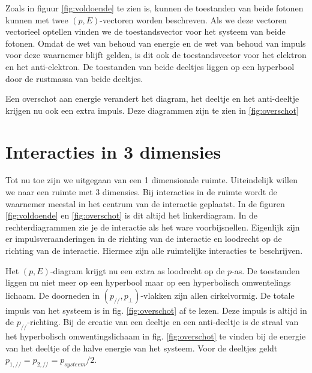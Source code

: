 Zoals in figuur \ref{fig:voldoende} te zien is, kunnen de toestanden van beide fotonen kunnen met twee $\left(p, E\right)$-vectoren worden beschreven. Als we deze vectoren vectorieel optellen
vinden we de toestandsvector voor het systeem van beide fotonen. Omdat
de wet van behoud van energie en de wet van behoud van impuls voor
deze waarnemer blijft gelden, is dit ook de toestandsvector voor het
elektron en het anti-elektron. De toestanden van beide deeltjes liggen
op een hyperbool door de rustmassa van beide deeltjes. 


Een overschot aan energie verandert het diagram, het deeltje en het anti-deeltje krijgen nu ook een extra impuls. Deze diagrammen zijn te zien in \ref{fig:overschot}


\section{Interacties in 3 dimensies}

Tot nu toe zijn we uitgegaan van een 1 dimensionale ruimte. Uiteindelijk willen we naar een ruimte met 3 dimensies. Bij interacties in de ruimte wordt de waarnemer meestal in het centrum van de interactie geplaatst. In de figuren \ref{fig:voldoende} en \ref{fig:overschot} is dit altijd het linkerdiagram. In de rechterdiagrammen zie je de interactie als het ware voorbijsnellen. Eigenlijk zijn er impulsveraanderingen in de richting van de interactie en loodrecht op de richting van de interactie. Hiermee zijn alle ruimtelijke interacties te beschrijven.

Het $(p,E)$-diagram krijgt nu een extra as loodrecht op de $p$-as. De toestanden liggen nu niet meer op een hyperbool maar op een hyperbolisch omwentelings lichaam. De doorneden in $\left(p_{//},p_{\perp}\right)$-vlakken zijn allen cirkelvormig. De totale impuls van het systeem is in fig. \ref{fig:overschot} af te lezen. Deze impuls is altijd in de $p_{//}$-richting. Bij de creatie van een deeltje en een anti-deeltje is de straal van het hyperbolisch omwentingslichaam in fig. \ref{fig:overschot} te vinden bij de energie van het deeltje of de halve energie van het systeem. Voor de deeltjes geldt $p_{1,//}=p_{2,//}=p_{systeem}/2$.

